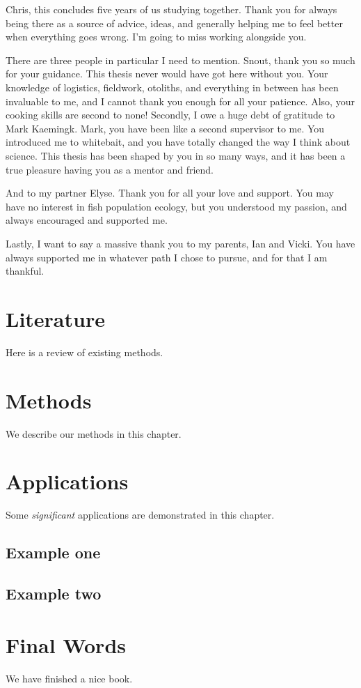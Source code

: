 \documentclass[]{book}
\begin{document}
Chris, this concludes five years of us studying together. Thank you for
always being there as a source of advice, ideas, and generally helping
me to feel better when everything goes wrong. I'm going to miss working
alongside you.

There are three people in particular I need to mention. Snout, thank you
so much for your guidance. This thesis never would have got here without
you. Your knowledge of logistics, fieldwork, otoliths, and everything in
between has been invaluable to me, and I cannot thank you enough for all
your patience. Also, your cooking skills are second to none! Secondly, I
owe a huge debt of gratitude to Mark Kaemingk. Mark, you have been like
a second supervisor to me. You introduced me to whitebait, and you have
totally changed the way I think about science. This thesis has been
shaped by you in so many ways, and it has been a true pleasure having
you as a mentor and friend.

And to my partner Elyse. Thank you for all your love and support. You
may have no interest in fish population ecology, but you understood my
passion, and always encouraged and supported me.

Lastly, I want to say a massive thank you to my parents, Ian and Vicki.
You have always supported me in whatever path I chose to pursue, and for
that I am thankful.

\chapter{Literature}\label{literature}

Here is a review of existing methods.

\chapter{Methods}\label{methods}

We describe our methods in this chapter.

\chapter{Applications}\label{applications}

Some \emph{significant} applications are demonstrated in this chapter.

\section{Example one}\label{example-one}

\section{Example two}\label{example-two}

\chapter{Final Words}\label{final-words}

We have finished a nice book.


\end{document}
